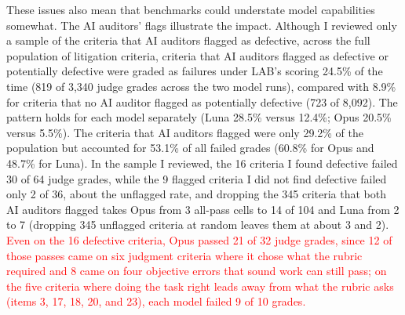 \documentclass[11pt]{article}
\newcommand{\draft}[1]{\textcolor{red}{#1}}
\newcommand{\labFlaggedPct}{29.2}
\newcommand{\labDefective}{16}
\newcommand{\labDefectiveGrades}{32}
\newcommand{\labFlaggedGrades}{3{,}340}
\newcommand{\labFlaggedGradeFails}{819}
\newcommand{\labFlaggedGradeFailPct}{24.5}
\newcommand{\labUnflaggedGrades}{8{,}092}
\newcommand{\labUnflaggedGradeFails}{723}
\newcommand{\labUnflaggedGradeFailPct}{8.9}
\newcommand{\labLunaFlaggedGradeFailPct}{28.5}
\newcommand{\labLunaUnflaggedGradeFailPct}{12.4}
\newcommand{\labOpusFlaggedGradeFailPct}{20.5}
\newcommand{\labOpusUnflaggedGradeFailPct}{5.5}
\newcommand{\labFlaggedFailSharePct}{53.1}
\newcommand{\labNativeCells}{104}
\newcommand{\labNativeLunaAllPass}{2}
\newcommand{\labNativeOpusAllPass}{3}
\newcommand{\labPopulationBothFlagged}{345}
\newcommand{\labOpusAllPassWithoutBothFlagged}{14}
\newcommand{\labLunaAllPassWithoutBothFlagged}{7}
\begin{document}
These issues also mean that benchmarks could understate model capabilities somewhat. The AI auditors' flags illustrate the impact. Although I reviewed only a sample of the criteria that AI auditors flagged as defective, across the full population of litigation criteria, criteria that AI auditors flagged as defective or potentially defective were graded as failures under LAB's scoring \labFlaggedGradeFailPct\% of the time (\labFlaggedGradeFails{} of \labFlaggedGrades{} judge grades across the two model runs), compared with \labUnflaggedGradeFailPct\% for criteria that no AI auditor flagged as potentially defective (\labUnflaggedGradeFails{} of \labUnflaggedGrades{}). The pattern holds for each model separately (Luna \labLunaFlaggedGradeFailPct\% versus \labLunaUnflaggedGradeFailPct\%; Opus \labOpusFlaggedGradeFailPct\% versus \labOpusUnflaggedGradeFailPct\%). The criteria that AI auditors flagged were only \labFlaggedPct\% of the population but accounted for \labFlaggedFailSharePct\% of all failed grades (60.8\% for Opus and 48.7\% for Luna). In the sample I reviewed, the \labDefective{} criteria I found defective failed 30 of 64 judge grades, while the 9 flagged criteria I did not find defective failed only 2 of 36, about the unflagged rate, and dropping the \labPopulationBothFlagged{} criteria that both AI auditors flagged takes Opus from \labNativeOpusAllPass{} all-pass cells to \labOpusAllPassWithoutBothFlagged{} of \labNativeCells{} and Luna from \labNativeLunaAllPass{} to \labLunaAllPassWithoutBothFlagged{} (dropping \labPopulationBothFlagged{} unflagged criteria at random leaves them at about 3 and 2). \draft{Even on the \labDefective{} defective criteria, Opus passed 21 of \labDefectiveGrades{} judge grades, since 12 of those passes came on six judgment criteria where it chose what the rubric required and 8 came on four objective errors that sound work can still pass; on the five criteria where doing the task right leads away from what the rubric asks (items 3, 17, 18, 20, and 23), each model failed 9 of 10 grades.}
\end{document}
